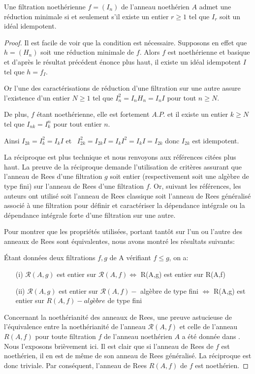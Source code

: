\begin{maproposition}
	Une filtration noethérienne $f=(I_{n})$ de l'anneau noethérien $A$
	admet une réduction minimale si et seulement s'il existe un entier $r\geq 1$ tel que $I_{r}$ soit un idéal idempotent.
\end{maproposition}
\begin{proof}
	Il est facile de voir que la condition est nécessaire. Supposons en effet que $h=(H_{n})$ soit une réduction minimale de $f$. Alors $f $ est noethérienne et basique et d'après le résultat précédent énonce plus haut, il existe un idéal idempotent $I$ tel que $h=f_{I}$. 
	
	Or l'une des caractérisations de réduction d'une filtration sur une
	autre assure l'existence d'un entier $N\geq 1$ tel que $I_{n}^{2}=I_{n}H_{n}=I_{n}I$ pour tout $n\geq N$. 
	
	De plus, $f$ étant noethérienne, elle est fortement $A.P.$ et il
	existe un entier $k\geq N$ tel que $I_{nk}=I_{k}^{n}$ pour tout entier $n$. 
	
	Ainsi $I_{2k}=I_{k}^{2}=I_{k}I$ et \ $I_{2k}^{2}=I_{2k}I=I_{k}I^{2}=I_{k}I=I_{2k}$ donc $I_{2k}$ est idempotent.
	
	La réciproque est plus technique et nous renvoyons aux références citées plus haut. La preuve de la réciproque demande l'utilisation de critères assurant que l'anneau de Rees d'une filtration $g$ soit entier (respectivement soit une algèbre de type fini) sur l'anneau de Rees d'une filtration $f.$ Or, suivant les références, les auteurs ont utilisé soit l'anneau de Rees classique soit l'anneau de Rees généralisé associé à une filtration pour définir et caractériser la dépendance intégrale ou la dépendance intégrale forte d'une filtration sur une autre. 
	
	Pour montrer que les propriétés utilisées, portant tantôt sur l'un ou l'autre des anneaux de
	Rees sont équivalentes, nous avons montré les résultats suivants:
	
	Étant données deux filtrations $f,g$ de A vérifiant $f\leq g$, on a:
	\begin{enumerate}
		\item[(i)]  $\mathcal{R}(A,g)$ est entier sur $\mathcal{R}(A,f)\Longleftrightarrow $ R(A,g) est entier
		sur R(A,f)
		\item[(ii)] $\mathcal{R}(A,g)$ est entier sur $\mathcal{R}(A,f)-$ algèbre de type fini $\Longleftrightarrow $ R(A,g) est entier sur $R(A,f)-algèbre$ de type fini
	\end{enumerate}
	Concernant la noethérianité des anneaux de Rees, une preuve astucieuse de l'équivalence entre la noethérianité de l'anneau $\mathcal{R}(A,f)$ et celle de l'anneau $R(A,f)$ pour toute filtration $f$ de l'anneau noethérien $A$ a été donnée dans \cite{6}. Nous l'exposons brièvement ici. Il est clair que si l'anneau de Rees de $f$ est noethérien, il en est de m\^{e}me de son anneau de Rees généralisé. La réciproque est donc triviale. Par conséquent, l'anneau de Rees $R(A,f)$ de $f$ est noethérien.
	
\end{proof}


